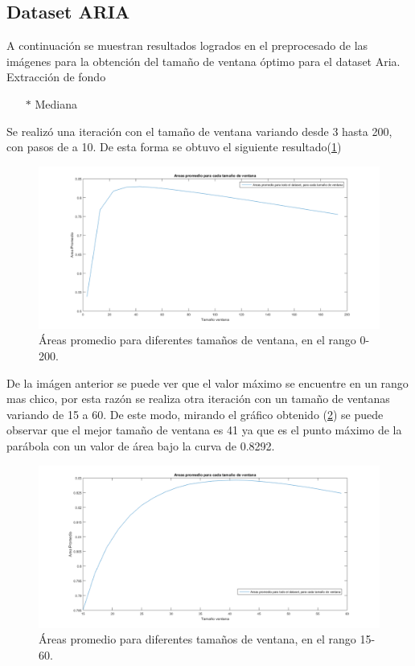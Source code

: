 \subsection{Dataset ARIA}

A continuación se muestran resultados logrados en el preprocesado de las imágenes para la obtención del tamaño de ventana óptimo para el dataset Aria.\\

Extracción de fondo
\begin{itemize}
	\item[$*$]Mediana 
\end{itemize}
Se realiz\'o una iteraci\'on con el tamaño de ventana variando desde 3 hasta 200, con pasos de a 10. De esta forma se obtuvo el siguiente resultado(\ref{fig:MedianaRangoGrande})\\

\begin{figure}[H]
	{
	\centering
	\includegraphics[width=1\textwidth]{Figures/MedianaRangoGrande}
	\caption[Ventana Mediana 0-200]{\'Areas promedio para diferentes tamaños de ventana, en el rango 0-200.}
	\label{fig:MedianaRangoGrande}
	}
\end{figure}	

De la im\'agen anterior se puede ver que el valor m\'aximo se encuentre en un rango mas chico, por esta  raz\'on se realiza otra iteraci\'on con un tamaño de ventanas variando de 15 a 60. De este modo, mirando el gr\'afico obtenido (\ref{fig:MedianaRangoChico}) se puede observar que  el mejor tama\~no de ventana es 41 ya que es el punto m\'aximo de la par\'abola con un valor de \'area bajo la curva de 0.8292.

\begin{figure}[H]
	{
	\centering
	\includegraphics[width=1\textwidth]{Figures/MedianaRangoChico}
	\caption[Ventana Mediana 15-60]{\'Areas promedio para diferentes tamaños de ventana, en el rango 15-60.}
	\label{fig:MedianaRangoChico}
	}
\end{figure}	

